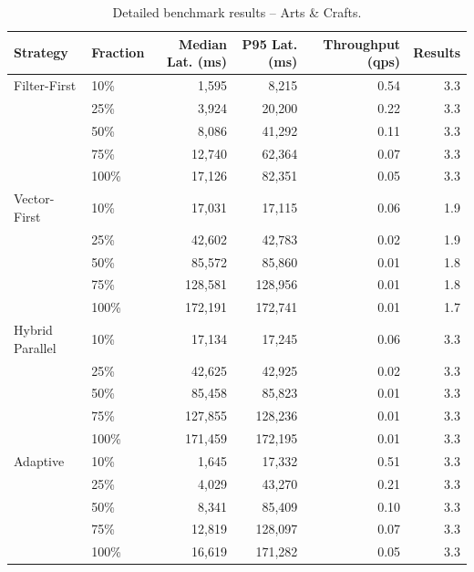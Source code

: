 \begin{table}[ht]
\centering
\small
\begin{tabular}{llrrrr}
\hline
Strategy & Fraction & Median Lat. (ms) & P95 Lat. (ms) & Throughput (qps) & Results \\
\hline
Filter-First & 10\% & 1,595 & 8,215 & 0.54 & 3.3 \\
 & 25\% & 3,924 & 20,200 & 0.22 & 3.3 \\
 & 50\% & 8,086 & 41,292 & 0.11 & 3.3 \\
 & 75\% & 12,740 & 62,364 & 0.07 & 3.3 \\
 & 100\% & 17,126 & 82,351 & 0.05 & 3.3 \\
\hline
Vector-First & 10\% & 17,031 & 17,115 & 0.06 & 1.9 \\
 & 25\% & 42,602 & 42,783 & 0.02 & 1.9 \\
 & 50\% & 85,572 & 85,860 & 0.01 & 1.8 \\
 & 75\% & 128,581 & 128,956 & 0.01 & 1.8 \\
 & 100\% & 172,191 & 172,741 & 0.01 & 1.7 \\
\hline
Hybrid Parallel & 10\% & 17,134 & 17,245 & 0.06 & 3.3 \\
 & 25\% & 42,625 & 42,925 & 0.02 & 3.3 \\
 & 50\% & 85,458 & 85,823 & 0.01 & 3.3 \\
 & 75\% & 127,855 & 128,236 & 0.01 & 3.3 \\
 & 100\% & 171,459 & 172,195 & 0.01 & 3.3 \\
\hline
Adaptive & 10\% & 1,645 & 17,332 & 0.51 & 3.3 \\
 & 25\% & 4,029 & 43,270 & 0.21 & 3.3 \\
 & 50\% & 8,341 & 85,409 & 0.10 & 3.3 \\
 & 75\% & 12,819 & 128,097 & 0.07 & 3.3 \\
 & 100\% & 16,619 & 171,282 & 0.05 & 3.3 \\
\hline
\end{tabular}
\caption{Detailed benchmark results -- Arts \& Crafts.}
\label{tab:detail-arts_crafts_and_sewing}
\end{table}